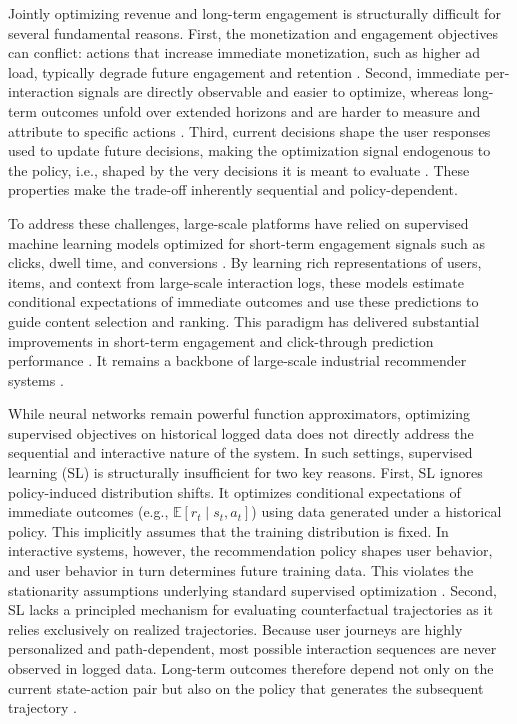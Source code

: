 \documentclass[manuscript,review,screen]{acmart}
\begin{document}
Jointly optimizing revenue and long-term engagement is structurally difficult for several fundamental reasons. First, the monetization and engagement objectives can conflict: actions that increase immediate monetization, such as higher ad load, typically degrade future engagement and retention \cite{sagtani2023quantifying, yan2020ads}. Second, immediate per-interaction signals are directly observable and easier to optimize, whereas long-term outcomes unfold over extended horizons and are harder to measure and attribute to specific actions \cite{hohnhold2015focusing, wang2022surrogate, mcdonald2023impatient}. Third, current decisions shape the user responses used to update future decisions, making the optimization signal endogenous to the policy, i.e., shaped by the very decisions it is meant to evaluate \cite{zou2019reinforcement, ie2019slateq}. These properties make the trade-off inherently sequential and policy-dependent.

To address these challenges, large-scale platforms have relied on supervised machine learning models optimized for short-term engagement signals such as clicks, dwell time, and conversions \cite{mcmahan2013ad, covington2016deep, cheng2016wide, yi2014beyond}. By learning rich representations of users, items, and context from large-scale interaction logs, these models estimate conditional expectations of immediate outcomes and use these predictions to guide content selection and ranking. This paradigm has delivered substantial improvements in short-term engagement \cite{cheng2016wide} and click-through prediction performance \cite{mcmahan2013ad}. It remains a backbone of large-scale industrial recommender systems \cite{naumov2019deep}.

While neural networks remain powerful function approximators, optimizing supervised objectives on historical logged data does not directly address the sequential and interactive nature of the system. In such settings, supervised learning (SL) is structurally insufficient for two key reasons. First, SL ignores policy-induced distribution shifts. It optimizes conditional expectations of immediate outcomes (e.g., $\mathbb{E}[r_t \mid s_t, a_t]$) using data generated under a historical policy. This implicitly assumes that the training distribution is fixed. In interactive systems, however, the recommendation policy shapes user behavior, and user behavior in turn determines future training data. This violates the stationarity assumptions underlying standard supervised optimization \cite{swaminathan2015counterfactual, dudik2011doubly}. Second, SL lacks a principled mechanism for evaluating counterfactual trajectories as it relies exclusively on realized trajectories. Because user journeys are highly personalized and path-dependent, most possible interaction sequences are never observed in logged data. Long-term outcomes therefore depend not only on the current state-action pair but also on the policy that generates the subsequent trajectory \cite{agarwal2016statistical}.
\end{document}
